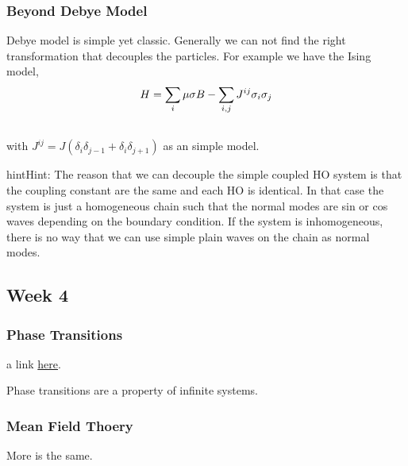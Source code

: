 \documentclass[letterpaper,10pt,english]{sphinxmanual}
\begin{document}
\subsubsection{Beyond Debye Model}
\label{equilibrium/week3:beyond-debye-model}
Debye model is simple yet classic. Generally we can not find the right transformation that decouples the particles. For example we have the Ising model,
\begin{gather}
\begin{split}H = \sum_i \mu \sigma B - \sum _ {i,j} J^{ij}\sigma_i \sigma _ j\end{split}\notag\\\begin{split}\end{split}\notag
\end{gather}
with $J^{ij} = J (  \delta _ i \delta _ {j-1} +\delta _ i \delta _{j+1} )$ as an simple model.

\begin{notice}{hint}{Hint:}
The reason that we can decouple the simple coupled HO system is that the coupling constant are the same and each HO is identical. In that case the system is just a homogeneous chain such that the normal modes are sin or cos waves depending on the boundary condition. If the system is inhomogeneous, there is no way that we can use simple plain waves on the chain as normal modes.
\end{notice}


\subsection{Week 4}
\label{equilibrium/week4:week-4}\label{equilibrium/week4::doc}

\subsubsection{Phase Transitions}
\label{equilibrium/week4:phase-transitions}
a link \href{http://jfi.uchicago.edu/~leop/TALKS/Perimeter\%20Stat\%20Mech\%20Lectures/lectures\%20in\%20PDF/Part\%207\%20Mean\%20Field\%20Theory.pdf}{here}.

Phase transitions are a property of infinite systems.


\subsubsection{Mean Field Thoery}
\label{equilibrium/week4:mean-field-thoery}
More is the same.
\end{document}

